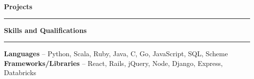 \documentclass[11pt,letterpaper]{article}
\makeatletter
\newenvironment{topic}[1]
    {
    {\Large \centerline{#1}}
    \vspace*{0.03in}
    \hrule 
    \vspace*{0.05in}
    }
    {}
\newenvironment{event}
    {
    \begin{tabular*}{\textwidth}{l@{\extracolsep{\fill}}r}
    }
    {
    \end{tabular*}
    }
\newenvironment{detail}
    {
    \normalsize
    }
    {
    \vspace*{0.02in}
    }
\makeatother
\begin{document}
\begin{topic}{\textbf{Projects}}


    \end{topic} \vspace*{0.1in}


    \begin{topic}{\textbf{Skills and Qualifications}}
        \begin{detail}
            \textbf{Languages} -- Python, Scala, Ruby, Java, C, Go, JavaScript, SQL, Scheme \\
            \textbf{Frameworks/Libraries} -- React, Rails, jQuery, Node, Django, Express, Databricks 
        \end{detail}
    \end{topic}
\end{document}
